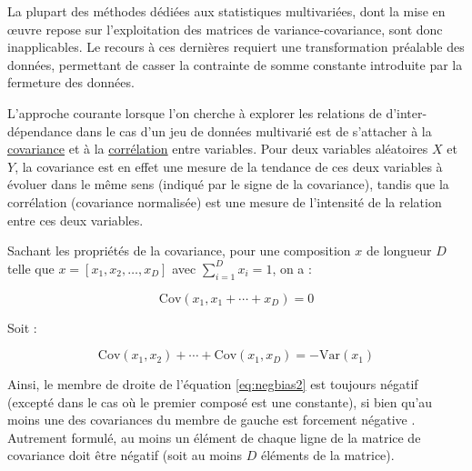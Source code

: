 \documentclass[
  french,
]{scrbook}
\begin{document}
La plupart des méthodes dédiées aux statistiques multivariées, dont la mise en œuvre repose sur l'exploitation des matrices de variance-covariance, sont donc inapplicables. Le recours à ces dernières requiert une transformation préalable des données, permettant de casser la contrainte de somme constante introduite par la fermeture des données.

\begin{tcolorbox}[fonttitle=\sffamily\bfseries\large,title=Remarque,colframe=darkblue]

L'approche courante lorsque l'on cherche à explorer les relations de d'inter-dépendance dans le cas d'un jeu de données multivarié est de s'attacher à la \protect\hyperlink{covariance}{covariance} et à la \protect\hyperlink{correlation}{corrélation} entre variables. Pour deux variables aléatoires \(X\) et \(Y\), la covariance est en effet une mesure de la tendance de ces deux variables à évoluer dans le même sens (indiqué par le signe de la covariance), tandis que la corrélation (covariance normalisée) est une mesure de l'intensité de la relation entre ces deux variables.

Sachant les propriétés de la covariance, pour une composition \(x\) de longueur \(D\) telle que \(x = \left[ x_{1}, x_{2}, \dotsc, x_{D} \right]\) avec \(\sum_{i=1}^{D} x_{i} = 1\), on a :

\begin{equation}
  \mathrm{Cov}(x_{1}, x_{1} + \dotsb + x_{D}) = 0
  \label{eq:negbias1}
\end{equation}

Soit :

\begin{equation}
  \mathrm{Cov}(x_{1}, x_{2}) + \dotsb + \mathrm{Cov}(x_{1}, x_{D}) = - \mathrm{Var}(x_{1})
  \label{eq:negbias2}
\end{equation}

Ainsi, le membre de droite de l'équation \eqref{eq:negbias2} est toujours négatif (excepté dans le cas où le premier composé est une constante), si bien qu'au moins une des covariances du membre de gauche est forcement négative \autocite[p.~53-54]{aitchison1986}. Autrement formulé, au moins un élément de chaque ligne de la matrice de covariance doit être négatif (soit au moins \(D\) éléments de la matrice).


\end{tcolorbox}
\end{document}

